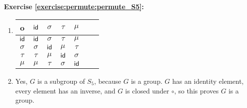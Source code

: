 \noindent\textbf{Exercise \ref{exercise:permute:permute_S5}:}
\begin{enumerate}[{a.}]
\item
\begin{tabular}{c| c c c c c c}
		o & $\sf{id}$ & $\sigma$ & $\tau$ & $\mu$\\ \hline
		$\sf{id}$ & $\sf{id}$ & $\sigma$ & $\tau$ & $\mu$\\
		$\sigma$ & $\sigma$ & $\sf{id}$ & $\mu$ & $\tau$\\
		$\tau$ & $\tau$ & $\mu$ & $\sf{id}$ & $\sigma$\\
		$\mu$ & $\mu$ & $\tau$ & $\sigma$ & $\sf{id}$\\
\end{tabular}

\item
Yes, $G$ is a subgroup of $S_5$, because $G$ is a group.  $G$ has an identity element, every element has an inverse, and $G$ is closed under $\circ$, so this proves $G$ is a group.
\end{enumerate}

